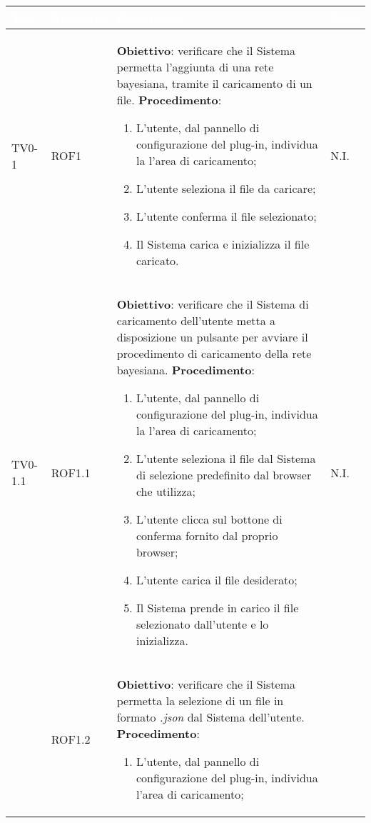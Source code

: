 \begin{longtable}{|C{.15\textwidth}|C{.13\textwidth}|m{.52\textwidth}|C{.08\textwidth}|}
\hline
{}\textbf{\textcolor{white}{Test}} & \textbf{\textcolor{white}{Requisito}} & \textbf{\textcolor{white}{Descrizione}} & \textbf{\textcolor{white}{Esito}}\\
\hline \hline
\endhead

TV0-1 & ROF1 &
	\textbf{Obiettivo}: verificare che il Sistema permetta l'aggiunta di una rete bayesiana, tramite il caricamento di un file. \newline
	\textbf{Procedimento}:
	\begin{enumerate}
		\item L'utente, dal pannello di configurazione del plug-in, individua la l'area di caricamento;
		\item L'utente seleziona il file da caricare;
		\item L'utente conferma il file selezionato;
		\item Il Sistema carica e inizializza il file caricato.
	\end{enumerate} & N.I. \\
\hline
{} TV0-1.1 & ROF1.1 &
	\textbf{Obiettivo}: verificare che il Sistema di caricamento dell'utente metta a disposizione un pulsante per avviare il procedimento di caricamento della rete bayesiana.
	\textbf{Procedimento}:
	\begin{enumerate}
		\item L'utente, dal pannello di configurazione del plug-in, individua la l'area di caricamento;
		\item L'utente seleziona il file dal Sistema di selezione predefinito dal browser che utilizza;
		\item L'utente clicca sul bottone di conferma fornito dal proprio browser;
		\item L'utente carica il file desiderato;
		\item Il Sistema prende in carico il file selezionato dall'utente e lo inizializza.
	\end{enumerate}
	& N.I. \\
\hline
{}   & ROF1.2 &
	\textbf{Obiettivo}: verificare che il Sistema permetta la selezione di un file in formato \textit{.json} dal Sistema dell'utente.\newline
	\textbf{Procedimento}:
	\begin{enumerate}
		\item L'utente, dal pannello di configurazione del plug-in, individua l'area di caricamento;

\end{enumerate}
\end{longtable}
